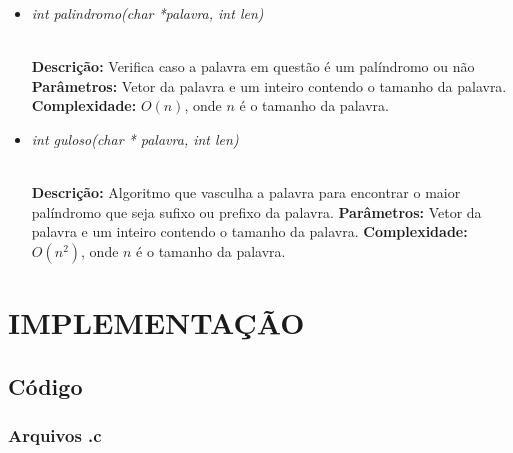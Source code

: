 \documentclass[12pt]{article}
\begin{document}
\begin{itemize}
 \item \begin{large}\textit{int palindromo(char *palavra, int len)}\end{large}\\
 \subitem \textbf{Descrição:} Verifica caso a palavra em questão é um palíndromo ou não
 \subitem \textbf{Parâmetros:} Vetor da palavra e um inteiro contendo o tamanho da palavra.
 \subitem \textbf{Complexidade:} $O(n)$, onde $n$ é o tamanho da palavra.
\end{itemize}

\vspace{0.2 true cm}

\begin{itemize}
 \item \begin{large}\textit{int guloso(char * palavra, int len)}\end{large}\\
 \subitem \textbf{Descrição:} Algoritmo que vasculha a palavra para encontrar o maior palíndromo que seja sufixo ou prefixo da palavra.
 \subitem \textbf{Parâmetros:} Vetor da palavra e um inteiro contendo o tamanho da palavra.
 \subitem \textbf{Complexidade:} $O(n^2)$, onde $n$ é o tamanho da palavra.
\end{itemize}

\vspace{0.2 true cm}


\section{IMPLEMENTAÇÃO}
\label{implementacao}

\subsection{Código}

\subsubsection{Arquivos .c}
\end{document}
